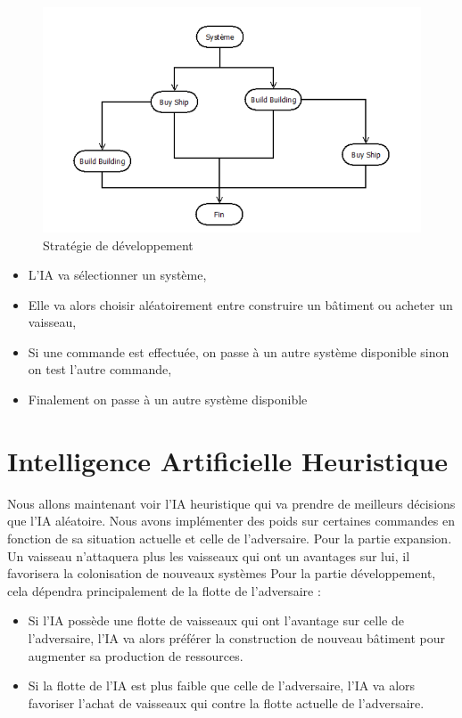 \begin{figure}[!h]
\centering
\includegraphics[width=1\textwidth]{pics/IA_random2.PNG}
\caption[Stratégie de développement]{\label{figure_simple}Stratégie de développement}
\end{figure}

\begin{itemize}
\item L'IA va sélectionner un système,
\item Elle va alors choisir aléatoirement entre construire un bâtiment ou acheter un vaisseau,
\item Si une commande est effectuée, on passe à un autre système disponible sinon on test l'autre commande,
\item Finalement on passe à un autre système disponible
\end{itemize}

\section{Intelligence Artificielle Heuristique}

Nous allons maintenant voir l'IA heuristique qui va prendre de meilleurs décisions que l'IA aléatoire. Nous avons implémenter des poids sur certaines commandes en fonction de sa situation actuelle et celle de l'adversaire.
Pour la partie expansion. Un vaisseau n'attaquera plus les vaisseaux qui ont un avantages sur lui, il favorisera la colonisation de nouveaux systèmes
Pour la partie développement, cela dépendra principalement de la flotte de l'adversaire :\\

\begin{itemize}
    \item Si l'IA possède une flotte de vaisseaux qui ont l'avantage sur celle de l'adversaire, l'IA va alors préférer la construction de nouveau bâtiment pour augmenter sa production de ressources. 
    \item Si la flotte de l'IA est plus faible que celle de l'adversaire, l'IA va alors favoriser l'achat de vaisseaux qui contre la flotte actuelle de l'adversaire.
\end{itemize}
